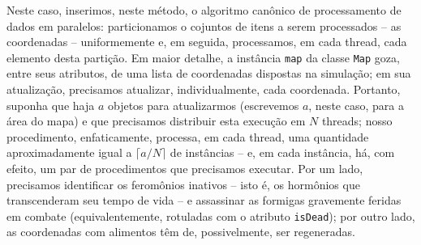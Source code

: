 \documentclass[12pt]{article}
\theoremstyle{definition}
\begin{document}
Neste caso, inserimos, neste método, o algoritmo canônico de processamento de dados em paralelos: particionamos o cojuntos de itens a serem processados -- as coordenadas -- uniformemente e, em seguida, processamos, em cada thread, cada elemento desta partição. Em maior detalhe, a instância \texttt{map} da classe \texttt{Map} goza, entre seus atributos, de uma lista de coordenadas dispostas na simulação; em sua atualização, precisamos atualizar, individualmente, cada coordenada. Portanto, suponha que haja $a$ objetos para atualizarmos (escrevemos $a$, neste caso, para a área do mapa) e que precisamos distribuir esta execução em $N$ threads; nosso procedimento, enfaticamente, processa, em cada thread, uma quantidade aproximadamente igual a $\lceil a/N \rceil$ de instâncias -- e, em cada instância, há, com efeito, um par de procedimentos que precisamos executar. Por um lado, precisamos identificar os feromônios inativos -- isto é, os hormônios que transcenderam seu tempo de vida -- e assassinar as formigas gravemente feridas em combate (equivalentemente, rotuladas com o atributo \texttt{isDead}); por outro lado, as coordenadas com alimentos têm de, possivelmente, ser regeneradas.   
\end{document}
